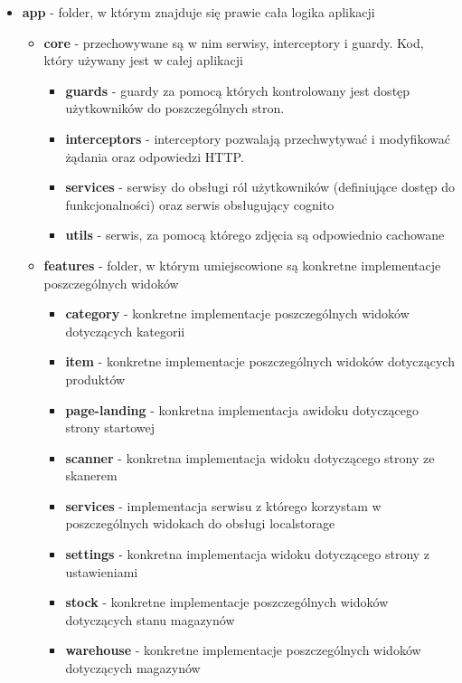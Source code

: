 \documentclass[../../main.tex]{subfiles}
\begin{document}
    \begin{itemize}
        \item \textbf{app} - folder, w którym znajduje się prawie cała logika aplikacji
        \begin{itemize}
            \item \textbf{core} - przechowywane są w nim serwisy, interceptory i guardy. Kod, który używany jest w całej aplikacji
            \begin{itemize}
                \item \textbf{guards} -  guardy za pomocą których kontrolowany jest dostęp użytkowników do poszczególnych stron. 
                \item \textbf{interceptors} - interceptory pozwalają przechwytywać i modyfikować żądania oraz odpowiedzi HTTP. 
                \item \textbf{services} - serwisy do obsługi ról użytkowników (definiujące dostęp do funkcjonalności) oraz serwis obsługujący cognito
                \item \textbf{utils} - serwis, za pomocą którego zdjęcia są odpowiednio cachowane
            \end{itemize}
            \item \textbf{features} - folder, w którym umiejscowione są konkretne implementacje poszczególnych widoków
            \begin{itemize}
                \item \textbf{category} - konkretne implementacje poszczególnych widoków dotyczących kategorii
                \item \textbf{item} - konkretne implementacje poszczególnych widoków dotyczących produktów
                \item \textbf{page-landing} - konkretna implementacja awidoku dotyczącego strony startowej
                \item \textbf{scanner} - konkretna implementacja widoku dotyczącego strony ze skanerem
                \item \textbf{services} - implementacja serwisu z którego korzystam w poszczególnych widokach do obsługi localstorage
                \item \textbf{settings} - konkretna implementacja widoku dotyczącego strony z ustawieniami
                \item \textbf{stock} - konkretne implementacje poszczególnych widoków dotyczących stanu magazynów
                \item \textbf{warehouse} - konkretne implementacje poszczególnych widoków dotyczących magazynów

\end{itemize}
\end{itemize}
\end{itemize}
\end{document}
